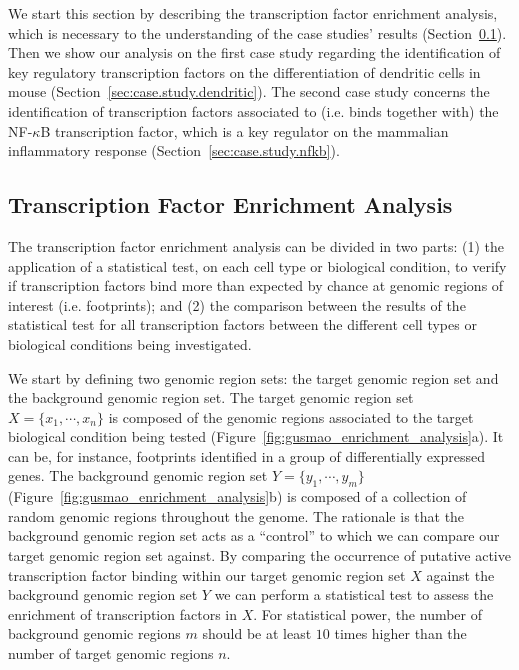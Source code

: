We start this section by describing the transcription factor enrichment analysis, which is necessary to the understanding of the case studies' results (Section~\ref{sec:transcription.factor.enrichment.analysis}). Then we show our analysis on the first case study regarding the identification of key regulatory transcription factors on the differentiation of dendritic cells in mouse (Section~\ref{sec:case.study.dendritic}). The second case study concerns the identification of transcription factors associated to (i.e. binds together with) the NF-$\kappa$B transcription factor, which is a key regulator on the mammalian inflammatory response (Section~\ref{sec:case.study.nfkb}).

\subsection{Transcription Factor Enrichment Analysis}
\label{sec:transcription.factor.enrichment.analysis}

The transcription factor enrichment analysis can be divided in two parts: (1) the application of a statistical test, on each cell type or biological condition, to verify if transcription factors bind more than expected by chance at genomic regions of interest (i.e. footprints); and (2) the comparison between the results of the statistical test for all transcription factors between the different cell types or biological conditions being investigated.

We start by defining two genomic region sets: the target genomic region set and the background genomic region set. The target genomic region set $X = \{ x_1, \cdots, x_n \}$ is composed of the genomic regions associated to the target biological condition being tested (Figure~\ref{fig:gusmao_enrichment_analysis}a). It can be, for instance, footprints identified in a group of differentially expressed genes. The background genomic region set $Y = \{ y_1, \cdots, y_m \}$ (Figure~\ref{fig:gusmao_enrichment_analysis}b) is composed of a collection of random genomic regions throughout the genome. The rationale is that the background genomic region set acts as a ``control'' to which we can compare our target genomic region set against. By comparing the occurrence of putative active transcription factor binding within our target genomic region set $X$ against the background genomic region set $Y$ we can perform a statistical test to assess the enrichment of transcription factors in $X$. For statistical power, the number of background genomic regions $m$ should be at least $10$ times higher than the number of target genomic regions $n$.

